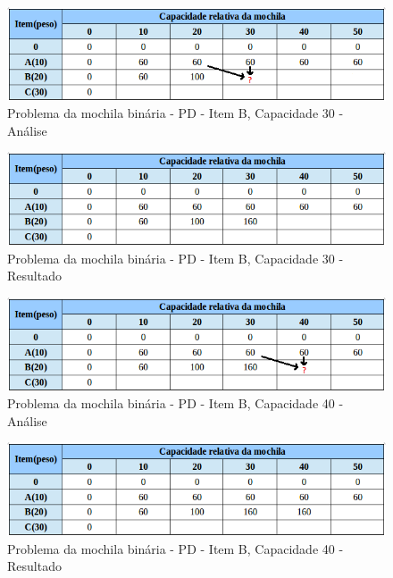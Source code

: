 \begin{itemize}
\FloatBarrier
\begin{figure}[!h]
\centering
\includegraphics[keepaspectratio=true,scale=0.6]{figuras/mochila20_30.png}
\caption{Problema da mochila binária - PD - Item B, Capacidade 30 - Análise}
\label{mochila20_30}
\end{figure}

\FloatBarrier
\begin{figure}[!h]
\centering
\includegraphics[keepaspectratio=true,scale=0.6]{figuras/mochila20_30_resp.png}
\caption{Problema da mochila binária - PD - Item B, Capacidade 30 - Resultado}
\label{mochila20_30_resp}
\end{figure}

\FloatBarrier
\begin{figure}[!h]
\centering
\includegraphics[keepaspectratio=true,scale=0.6]{figuras/mochila20_40.png}
\caption{Problema da mochila binária - PD - Item B, Capacidade 40 - Análise}
\label{mochila20_40}
\end{figure}

\FloatBarrier
\begin{figure}[!h]
\centering
\includegraphics[keepaspectratio=true,scale=0.6]{figuras/mochila20_40_resp.png}
\caption{Problema da mochila binária - PD - Item B, Capacidade 40 - Resultado}
\label{mochila20_40_resp}
\end{figure}


\end{itemize}
